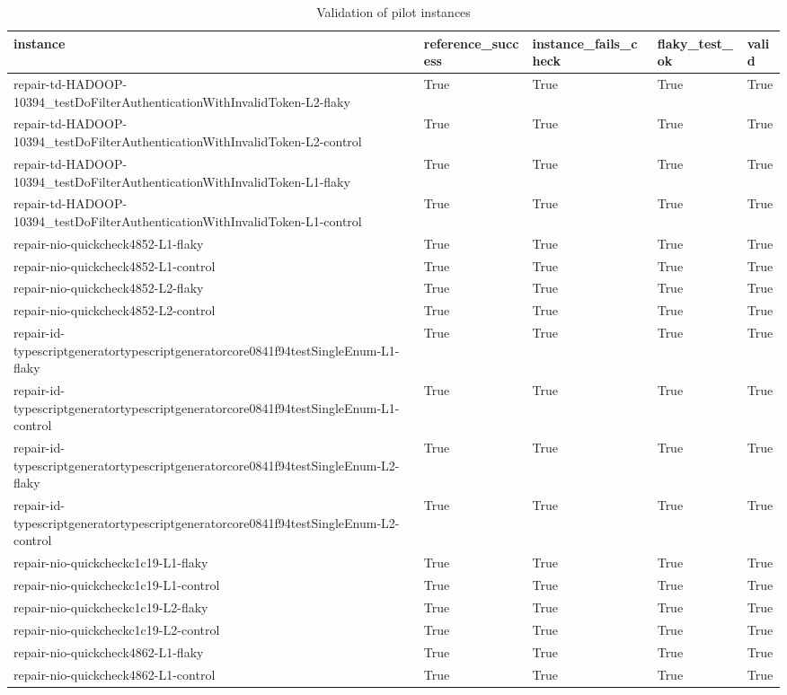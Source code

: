 \begin{table}[t]
\centering\small
\caption{Validation of pilot instances}
\label{tab:instance_validation}
\begin{tabular}{lllll}
\toprule
\textbf{instance} & \textbf{reference\_success} & \textbf{instance\_fails\_check} & \textbf{flaky\_test\_ok} & \textbf{valid} \\
\midrule
repair-td-HADOOP-10394\_testDoFilterAuthenticationWithInvalidToken-L2-flaky & True & True & True & True \\
repair-td-HADOOP-10394\_testDoFilterAuthenticationWithInvalidToken-L2-control & True & True & True & True \\
repair-td-HADOOP-10394\_testDoFilterAuthenticationWithInvalidToken-L1-flaky & True & True & True & True \\
repair-td-HADOOP-10394\_testDoFilterAuthenticationWithInvalidToken-L1-control & True & True & True & True \\
repair-nio-quickcheck4852-L1-flaky & True & True & True & True \\
repair-nio-quickcheck4852-L1-control & True & True & True & True \\
repair-nio-quickcheck4852-L2-flaky & True & True & True & True \\
repair-nio-quickcheck4852-L2-control & True & True & True & True \\
repair-id-typescriptgeneratortypescriptgeneratorcore0841f94testSingleEnum-L1-flaky & True & True & True & True \\
repair-id-typescriptgeneratortypescriptgeneratorcore0841f94testSingleEnum-L1-control & True & True & True & True \\
repair-id-typescriptgeneratortypescriptgeneratorcore0841f94testSingleEnum-L2-flaky & True & True & True & True \\
repair-id-typescriptgeneratortypescriptgeneratorcore0841f94testSingleEnum-L2-control & True & True & True & True \\
repair-nio-quickcheckc1c19-L1-flaky & True & True & True & True \\
repair-nio-quickcheckc1c19-L1-control & True & True & True & True \\
repair-nio-quickcheckc1c19-L2-flaky & True & True & True & True \\
repair-nio-quickcheckc1c19-L2-control & True & True & True & True \\
repair-nio-quickcheck4862-L1-flaky & True & True & True & True \\
repair-nio-quickcheck4862-L1-control & True & True & True & True \\

\end{tabular}
\end{table}
